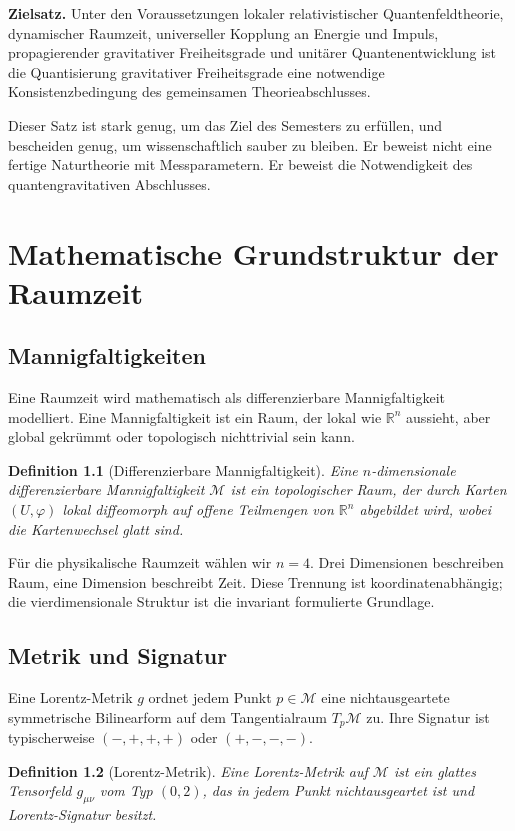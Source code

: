 \documentclass[11pt,a4paper]{book}
\newtheorem{definition}{Definition}[chapter]
\theoremstyle{remark}
\newcommand{\R}{\mathbb{R}}
\newcommand{\M}{\mathcal{M}}
\begin{document}
\begin{merkkasten}
\textbf{Zielsatz.} Unter den Voraussetzungen lokaler relativistischer Quantenfeldtheorie, dynamischer Raumzeit, universeller Kopplung an Energie und Impuls, propagierender gravitativer Freiheitsgrade und unitärer Quantenentwicklung ist die Quantisierung gravitativer Freiheitsgrade eine notwendige Konsistenzbedingung des gemeinsamen Theorieabschlusses.
\end{merkkasten}

Dieser Satz ist stark genug, um das Ziel des Semesters zu erfüllen, und bescheiden genug, um wissenschaftlich sauber zu bleiben. Er beweist nicht eine fertige Naturtheorie mit Messparametern. Er beweist die Notwendigkeit des quantengravitativen Abschlusses.

\chapter{Mathematische Grundstruktur der Raumzeit}
\section{Mannigfaltigkeiten}
Eine Raumzeit wird mathematisch als differenzierbare Mannigfaltigkeit modelliert. Eine Mannigfaltigkeit ist ein Raum, der lokal wie $\R^n$ aussieht, aber global gekrümmt oder topologisch nichttrivial sein kann.

\begin{definition}[Differenzierbare Mannigfaltigkeit]
Eine $n$-dimensionale differenzierbare Mannigfaltigkeit $\M$ ist ein topologischer Raum, der durch Karten $(U,\varphi)$ lokal diffeomorph auf offene Teilmengen von $\R^n$ abgebildet wird, wobei die Kartenwechsel glatt sind.
\end{definition}

Für die physikalische Raumzeit wählen wir $n=4$. Drei Dimensionen beschreiben Raum, eine Dimension beschreibt Zeit. Diese Trennung ist koordinatenabhängig; die vierdimensionale Struktur ist die invariant formulierte Grundlage.

\section{Metrik und Signatur}
Eine Lorentz-Metrik $g$ ordnet jedem Punkt $p\in\M$ eine nichtausgeartete symmetrische Bilinearform auf dem Tangentialraum $T_p\M$ zu. Ihre Signatur ist typischerweise $(-,+,+,+)$ oder $(+,-,-,-)$.

\begin{definition}[Lorentz-Metrik]
Eine Lorentz-Metrik auf $\M$ ist ein glattes Tensorfeld $g_{\mu\nu}$ vom Typ $(0,2)$, das in jedem Punkt nichtausgeartet ist und Lorentz-Signatur besitzt.
\end{definition}
\end{document}

